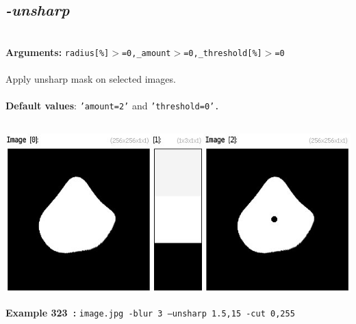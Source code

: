 \documentclass[a4paper,11pt,twoside]{book}
\begin{document}
\subsection{\emph{-unsharp} }\vspace*{-0.5em}
~\\\textbf{Arguments: } 
{\small \texttt{radius[\%]$>$=0,\_amount$>$=0,\_threshold[\%]$>$=0}}\\~\\
Apply unsharp mask on selected images.
~\\~\\\textbf{Default values}: {\small \texttt{'amount=2'} and \texttt{'threshold=0'.}}
\begin{center}\includegraphics[keepaspectratio=true,height=7cm,width=\textwidth]{img/gmic_def323.jpg}\\
{\footnotesize \textbf{Example 323~:} \texttt{image.jpg -blur 3 --unsharp 1.5,15 -cut 0,255}}
\end{center}
\end{document}
